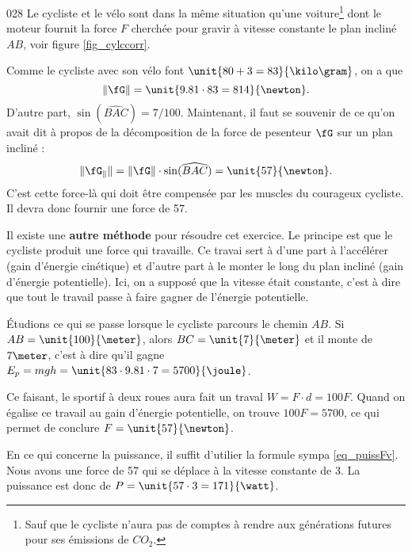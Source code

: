 \documentclass{article}
\begin{document}
\begin{corrige}{028}
Le cycliste et le vélo sont dans la même situation qu'une voiture\footnote{Sauf que le cycliste n'aura pas de comptes à rendre aux générations futures pour ses émissions de $CO_2$.} dont le moteur fournit la force $F$ cherchée pour gravir à vitesse constante le plan incliné $AB$, voir figure \ref{fig_cylccorr}. 

Comme le cycliste avec son vélo font $\unit{80+3=83}{\kilo\gram}$, on a que
\[
 \| \fG \|=\unit{9.81\cdot 83=814}{\newton}.
\]
 D'autre part, $\sin(\widehat{BAC})=7/100$. Maintenant, il faut se souvenir de ce qu'on avait dit à propos de la décomposition de la force de pesenteur $\fG$ sur un plan incliné :
\[ 
  \| \fG_{\parallel}\|=\| \fG \|\cdot\sin(\widehat{BAC}) =\unit{57}{\newton}. 
\]
C'est cette force-là qui doit être compensée par les muscles du courageux cycliste. Il devra donc fournir une force de \unit{57}{\newton}.


Il existe une {\bf autre méthode} pour résoudre cet exercice. Le principe est que le cycliste produit une force qui travaille. Ce travai sert à d'une part à l'accélérer (gain d'énergie cinétique) et d'autre part à le monter le long du plan incliné (gain d'énergie potentielle). Ici, on a supposé que la vitesse était constante, c'est à dire que tout le travail passe à faire gagner de l'énergie potentielle.

Étudions ce qui se passe lorsque le cycliste parcours le chemin $AB$. Si $AB=\unit{100}{\meter}$, alors $BC=\unit{7}{\meter}$ et il monte de $7\meter$, c'est à dire qu'il gagne $E_p=mgh=\unit{83\cdot 9.81\cdot 7=5700}{\joule}$. 

Ce faisant, le sportif à deux roues aura fait un traval $W=F\cdot d=100F$. Quand on égalise ce travail au gain d'énergie potentielle, on trouve $100F=5700$, ce qui permet de conclure $F=\unit{57}{\newton}$.

En ce qui concerne la puissance, il suffit d'utilier la formule sympa \eqref{eq_puissFv}. Nous avons une force de \unit{57}{\newton} qui se déplace à la vitesse constante de \unit{3}{\meter\per\second}. La puissance est donc de $P=\unit{57\cdot 3=171}{\watt}$.


\end{corrige}
\end{document}

